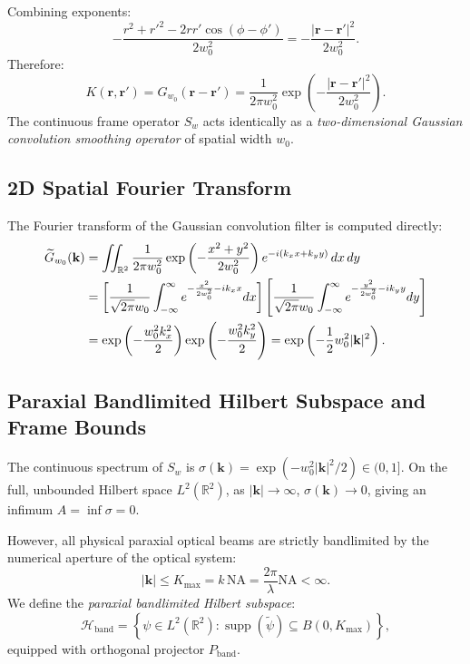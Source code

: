\documentclass[11pt,a4paper]{article}
\begin{document}
Combining exponents:
\begin{equation}
- \frac{r^2 + r'^2 - 2 r r' \cos(\phi - \phi')}{2 w_0^2} = - \frac{|\mathbf{r} - \mathbf{r}'|^2}{2 w_0^2}.
\label{eq:coordinate_difference}
\end{equation}
Therefore:
\begin{equation}
\boxed{K(\mathbf{r}, \mathbf{r}') = G_{w_0}(\mathbf{r} - \mathbf{r}') = \frac{1}{2\pi w_0^2} \exp\left( - \frac{|\mathbf{r} - \mathbf{r}'|^2}{2 w_0^2} \right).}
\label{eq:gaussian_kernel}
\end{equation}
The continuous frame operator $S_w$ acts identically as a \emph{two-dimensional Gaussian convolution smoothing operator} of spatial width $w_0$.

\subsection{2D Spatial Fourier Transform}

The Fourier transform of the Gaussian convolution filter is computed directly:
\begin{align}
\widetilde{G}_{w_0}(\mathbf{k}) &= \iint_{\mathbb{R}^2} \frac{1}{2\pi w_0^2} \exp\left( - \frac{x^2 + y^2}{2 w_0^2} \right) e^{-i(k_x x + k_y y)} \, dx \, dy \notag \\
&= \left[ \frac{1}{\sqrt{2\pi} w_0} \int_{-\infty}^\infty e^{-\frac{x^2}{2 w_0^2} - i k_x x} dx \right] \left[ \frac{1}{\sqrt{2\pi} w_0} \int_{-\infty}^\infty e^{-\frac{y^2}{2 w_0^2} - i k_y y} dy \right] \notag \\
&= \exp\left( - \frac{w_0^2 k_x^2}{2} \right) \exp\left( - \frac{w_0^2 k_y^2}{2} \right) = \exp\left( - \frac{1}{2} w_0^2 |\mathbf{k}|^2 \right).
\label{eq:fourier_kernel}
\end{align}

\subsection{Paraxial Bandlimited Hilbert Subspace and Frame Bounds}

The continuous spectrum of $S_w$ is $\sigma(\mathbf{k}) = \exp(-w_0^2 |\mathbf{k}|^2 / 2) \in (0, 1]$. On the full, unbounded Hilbert space $L^2(\mathbb{R}^2)$, as $|\mathbf{k}| \to \infty$, $\sigma(\mathbf{k}) \to 0$, giving an infimum $A = \inf \sigma = 0$.

However, all physical paraxial optical beams are strictly bandlimited by the numerical aperture of the optical system:
\begin{equation}
|\mathbf{k}| \le K_{\max} = k \, \text{NA} = \frac{2\pi}{\lambda} \text{NA} < \infty.
\label{eq:kmax_na}
\end{equation}
We define the \emph{paraxial bandlimited Hilbert subspace}:
\begin{equation}
\mathcal{H}_{\text{band}} = \left\{ \psi \in L^2(\mathbb{R}^2) : \operatorname{supp}(\widetilde{\psi}) \subseteq B(0, K_{\max}) \right\},
\label{eq:h_band_def}
\end{equation}
equipped with orthogonal projector $P_{\text{band}}$.
\end{document}
